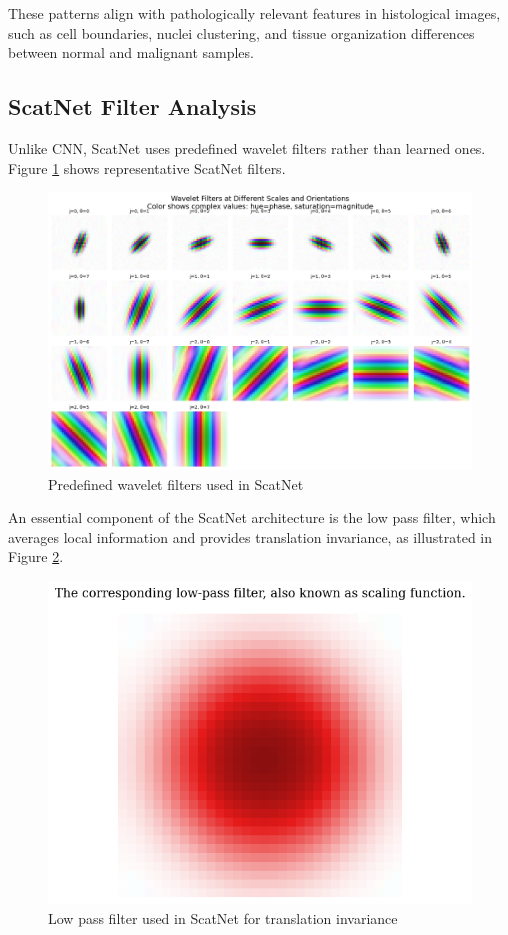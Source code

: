 \documentclass[10pt,twocolumn]{article}
\begin{document}
These patterns align with pathologically relevant features in histological images, such as cell boundaries, nuclei clustering, and tissue organization differences between normal and malignant samples.

\subsection{ScatNet Filter Analysis}
Unlike CNN, ScatNet uses predefined wavelet filters rather than learned ones. Figure \ref{fig:scatnet_filters} shows representative ScatNet filters.

\begin{figure}[h]
\centering
\includegraphics[width=0.7\columnwidth]{imgs/scatnet_filters.png}
\caption{Predefined wavelet filters used in ScatNet}
\label{fig:scatnet_filters}
\end{figure}

An essential component of the ScatNet architecture is the low pass filter, which averages local information and provides translation invariance, as illustrated in Figure \ref{fig:scatnet_low_pass}.

\begin{figure}[h]
\centering
\includegraphics[width=0.7\columnwidth]{imgs/scatnet_low_pass.png}
\caption{Low pass filter used in ScatNet for translation invariance}
\label{fig:scatnet_low_pass}
\end{figure}
\end{document}
